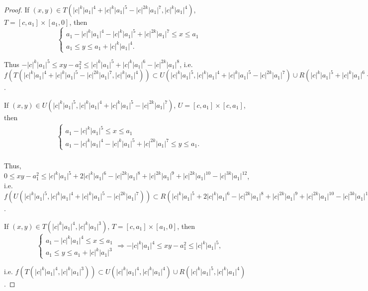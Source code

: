 \documentclass[11pt]{amsart}
\theoremstyle{definition}
\begin{document}
\begin{proof}
\vspace{1em}

If $(x,y)\in T(|c|^k|a_1|^4+|c|^k|a_1|^5-|c|^{2k}|a_1|^7,|c|^k|a_1|^4)$, $T=[c,a_1]\times [a_1,0]$, then
$$\left\{
\begin{array}{l}
a_1-|c|^k|a_1|^4-|c|^k|a_1|^5+|c|^{2k}|a_1|^7\leq x\leq a_1 \\
a_1\leq y\leq a_1+|c|^k|a_1|^4.
\end{array}
\right. 
$$

\noindent Thus $-|c|^k|a_1|^5\leq xy-a_1^2\leq |c|^k|a_1|^5+|c|^k|a_1|^6-|c|^{2k}|a_1|^8$, i.e. $f( T(|c|^k|a_1|^4+|c|^k|a_1|^5-|c|^{2k}|a_1|^7,|c|^k|a_1|^4)) \subset U(|c|^k|a_1|^5,|c|^k|a_1|^4+|c|^k|a_1|^5-|c|^{2k}|a_1|^7)\cup R(|c|^k|a_1|^5+|c|^k|a_1|^6-|c|^{2k}|a_1|^8,|c|^k|a_1|^4+|c|^k|a_1|^5-|c|^{2k}|a_1|^7)$.

\vspace{1em}

If $(x,y)\in U(|c|^k|a_1|^5,|c|^k|a_1|^4+|c|^k|a_1|^5-|c|^{2k}|a_1|^7)$, $U=[c,a_1]\times [c,a_1]$, then
$$
\begin{array}{rcl}
\left\{
\begin{array}{l}
a_1-|c|^k|a_1|^5\leq x\leq a_1 \\
a_1-|c|^k|a_1|^4-|c|^k|a_1|^5+|c|^{2k}|a_1|^7\leq y\leq a_1 .
\end{array}
\right. \\
\end{array}
$$

\noindent Thus, $0\leq xy-a_1^2\leq |c|^k|a_1|^5+2|c|^k|a_1|^6-|c|^{2k}|a_1|^8+|c|^{2k}|a_1|^9+|c|^{2k}|a_1|^{10}-|c|^{3k}|a_1|^{12}$, i.e. $f(U(|c|^k|a_1|^5,|c|^k|a_1|^4+|c|^k|a_1|^5-|c|^{2k}|a_1|^7))\subset R(|c|^k|a_1|^5+2|c|^k|a_1|^6-|c|^{2k}|a_1|^8+|c|^{2k}|a_1|^9+|c|^{2k}|a_1|^{10}-|c|^{3k}|a_1|^{12},|c|^k|a_1|^5)$.

\vspace{1em}

If $(x,y)\in T(|c|^k|a_1|^4,|c|^k|a_1|^3)$, $T=[c,a_1]\times [a_1,0]$, then
$$\left\{
\begin{array}{l}
a_1-|c|^k|a_1|^4\leq x\leq a_1 \\
a_1\leq y\leq a_1+|c|^k|a_1|^3
\end{array}
\right.
\Longrightarrow -|c|^k|a_1|^4\leq xy-a_1^2\leq |c|^k|a_1|^5,
$$

\noindent i.e. $f(T(|c|^k|a_1|^4,|c|^k|a_1|^3))\subset U(|c|^k|a_1|^4,|c|^k|a_1|^4)\cup R(|c|^k|a_1|^5,|c|^k|a_1|^4)$.

\vspace{1em}


\end{proof}
\end{document}
